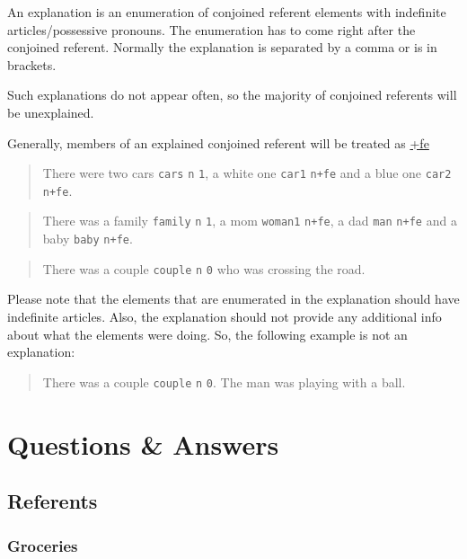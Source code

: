 \documentclass[
]{book}
\begin{document}
An explanation is an enumeration of conjoined referent elements with indefinite articles/possessive pronouns.
The enumeration has to come right after the conjoined referent.
Normally the explanation is separated by a comma or is in brackets.

Such explanations do not appear often, so the majority of conjoined referents will be unexplained.

Generally, members of an explained conjoined referent will be treated as \protect\hyperlink{further-explanation}{+fe}

\begin{quote}
There were two cars \texttt{cars} \texttt{n} \texttt{1}, a white one \texttt{car1} \texttt{n+fe} and a blue one \texttt{car2} \texttt{n+fe}.
\end{quote}

\begin{quote}
There was a family \texttt{family} \texttt{n} \texttt{1}, a mom \texttt{woman1} \texttt{n+fe}, a dad \texttt{man} \texttt{n+fe} and a baby \texttt{baby} \texttt{n+fe}.
\end{quote}

\begin{quote}
There was a couple \texttt{couple} \texttt{n} \texttt{0} who was crossing the road.
\end{quote}

Please note that the elements that are enumerated in the explanation should have indefinite articles. Also, the explanation should not provide any additional info about what the elements were doing. So, the following example is not an explanation:

\begin{quote}
There was a couple \texttt{couple} \texttt{n} \texttt{0}. The man was playing with a ball.
\end{quote}

\hypertarget{questions-answers}{%
\chapter{Questions \& Answers}\label{questions-answers}}

\hypertarget{referents-1}{%
\section{Referents}\label{referents-1}}

\hypertarget{groceries}{%
\subsection{Groceries}\label{groceries}}
\end{document}
